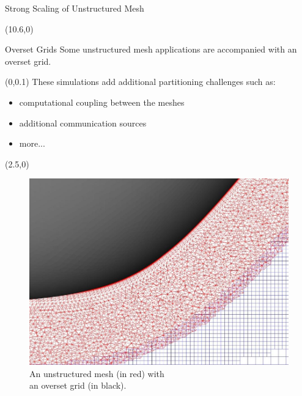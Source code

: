 \documentclass{beamer}
\begin{document}
\begin{textblock}{15.6}
\begin{textblock}{5}
\begin{block}{\centering Strong Scaling of Unstructured Mesh}
      
    \end{block}
  \end{textblock}
  \begin{textblock}{5}(10.6,0)
    \begin{block}{\centering Overset Grids}
      Some unstructured mesh applications are accompanied with an overset grid.
      \begin{textblock}{2.7}(0,0.1)
        These simulations add additional partitioning challenges such as:
        \begin{itemize}
        \item computational coupling between the meshes
        \item additional communication sources
        \item more...
        \end{itemize}

        

      \end{textblock}
      \begin{textblock}{2.5}(2.5,0)
        \begin{figure}
          \centering
          \includegraphics[height=.6\textwidth]{../figures/overset_grid.jpg}
          \caption{An unstructured mesh (in red) with \\an overset grid (in black).}
        \end{figure}
      \end{textblock}
      \vspace{14cm}


\end{block}
\end{textblock}
\end{textblock}
\end{document}
